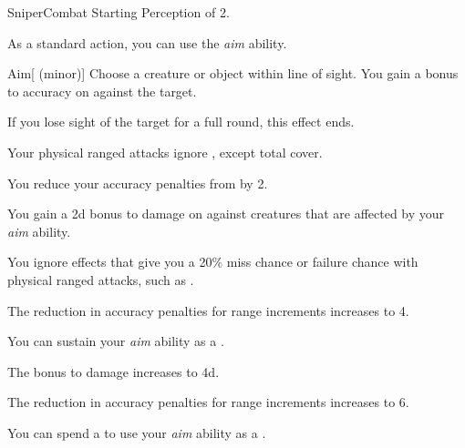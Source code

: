     \begin{feat}{Sniper}{Combat}
        \featpre Starting Perception of 2.

         As a standard action, you can use the \textit{aim} ability.
        \begin{ability}{Aim}[ (minor)]
            Choose a creature or object within line of sight.
            You gain a  bonus to accuracy on  against the target.

            If you lose sight of the target for a full round, this effect ends.
        \end{ability}

         Your physical ranged attacks ignore , except total cover.

         You reduce your accuracy penalties from  by 2.

         You gain a \plus2d bonus to damage on  against \unaware creatures that are affected by your \textit{aim} ability.

         You ignore effects that give you a 20\% miss chance or failure chance with physical ranged attacks, such as .

         The reduction in accuracy penalties for range increments increases to 4.

         You can sustain your \textit{aim} ability as a .

         The bonus to damage increases to \plus4d.

         The reduction in accuracy penalties for range increments increases to 6.

         You can spend a  to use your \textit{aim} ability as a .
    \end{feat}


